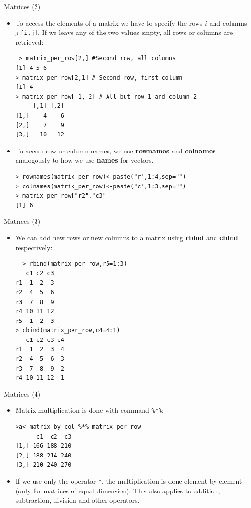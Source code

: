 \documentclass[handout]{beamer}
\begin{document}
\begin{frame}[fragile]{Matrices (2)}
\scriptsize{
 \begin{itemize}
  \item To access the elements of a matrix we have to specify the rows $i$ and columns $j$ \verb+[i,j]+. If we leave any of the two values empty, all rows or columns are retrieved:  
 \begin{verbatim}
 > matrix_per_row[2,] #Second row, all columns
[1] 4 5 6
> matrix_per_row[2,1] # Second row, first column
[1] 4
> matrix_per_row[-1,-2] # All but row 1 and column 2
     [,1] [,2]
[1,]    4    6
[2,]    7    9
[3,]   10   12 
 \end{verbatim}
\item To access row or column names, we use \textbf{rownames} and \textbf{colnames} analogously to how we use \textbf{names} for vectors.
\begin{verbatim}
> rownames(matrix_per_row)<-paste("r",1:4,sep="")
> colnames(matrix_per_row)<-paste("c",1:3,sep="")
> matrix_per_row["r2","c3"]
[1] 6
\end{verbatim}  
 \end{itemize}
 }
\end{frame}


\begin{frame}[fragile]{Matrices (3)}
\scriptsize{
\begin{itemize}
 \item We can add new rows or new columns to a matrix using \textbf{rbind} and \textbf{cbind} respectively:
 \begin{verbatim}
  > rbind(matrix_per_row,r5=1:3)
   c1 c2 c3
r1  1  2  3
r2  4  5  6
r3  7  8  9
r4 10 11 12
r5  1  2  3
> cbind(matrix_per_row,c4=4:1)
   c1 c2 c3 c4
r1  1  2  3  4
r2  4  5  6  3
r3  7  8  9  2
r4 10 11 12  1
 \end{verbatim}

\end{itemize}
 
 
 
} 
\end{frame}

\begin{frame}[fragile]{Matrices (4)}
\scriptsize{
\begin{itemize}
 \item Matrix multiplication is done with command \verb+%*%+:
 \begin{verbatim}
>a<-matrix_by_col %*% matrix_per_row
      c1  c2  c3
[1,] 166 188 210
[2,] 188 214 240
[3,] 210 240 270
 \end{verbatim}

 
\item  If we use only the operator \verb+*+, the multiplication is done element by element (only for matrices of equal dimension). This also applies to addition, subtraction, division and other operators.

\end{itemize}


 
}

\end{frame}
\end{document}
